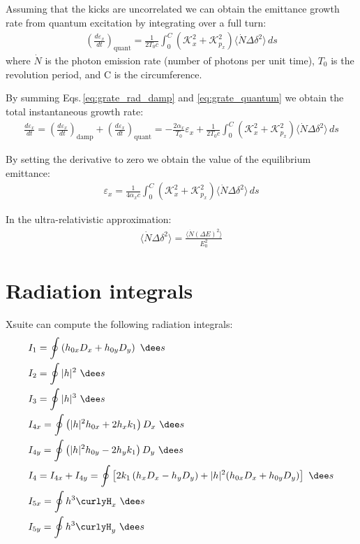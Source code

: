 Assuming that the kicks are uncorrelated we can obtain the emittance growth rate from quantum excitation by integrating over a full turn:
\begin{align}
\left(\frac {d\varepsilon_x}{dt} \right)_\text{quant}=
\frac{1}{2T_0c}\int_0^C\left(\mathcal{K}^2_x + \mathcal{K}^2_{p_x}\right)\langle\dot{N} \Delta \delta^2\rangle \,ds
\label{eq:grate_quantum}
\end{align}
where $\dot{N}$ is the photon emission rate (number of photons per unit time), $T_0$ is the revolution period, and C is the circumference.

By summing Eqs.\,\ref{eq:grate_rad_damp} and \ref{eq:grate_quantum} we obtain the total instantaneous growth rate:
\begin{align}
\frac {d\varepsilon_x}{dt} =
\left(\frac {d\varepsilon_x}{dt}\right)_\text{damp}
+
\left(\frac {d\varepsilon_x}{dt}\right)_\text{quant}
=
- \frac{2\alpha_x}{T_0}  \varepsilon_x
+
\frac{1}{2T_0c}\int_0^C\left(\mathcal{K}^2_x + \mathcal{K}^2_{p_x}\right)\langle\dot{N} \Delta \delta^2\rangle \,ds
\end{align}

By setting the derivative to zero we obtain the value of the equilibrium emittance:
\begin{align}
\varepsilon_x=
\frac{1}{4\alpha_xc}\int_0^C\left(\mathcal{K}^2_x + \mathcal{K}^2_{p_x}\right)\langle\dot{N} \Delta \delta^2\rangle \,ds
\label{eq:equilemi1}
\end{align}

In the ultra-relativistic approximation:
\begin{align}
\langle\dot{N} \Delta \delta^2\rangle =
\frac{\langle\dot{N} (\Delta E)^2\rangle}{E_0^2}
\label{eq:equilemi2}
\end{align}

\section{Radiation integrals}

Xsuite can compute the following radiation integrals:
\begin{align}
    &I_1 = \oint \left( h_{0x} D_x + h_{0y} D_y \right)\ \dee s\\
    &I_2 = \oint |h|^2 \ \dee s\\
    &I_3 = \oint |h|^3 \ \dee s\\
    &I_{4x} = \oint \left( |h|^2 h_{0x} + 2 h_x k_1 \right) D_x\ \dee s\\
    &I_{4y} = \oint \left( |h|^2 h_{0y} - 2 h_y k_1 \right) D_y\ \dee s\\
    &I_4 = I_{4x} + I_{4y} = \oint \left[ 2k_1 \left( h_x D_x - h_y D_y \right) + |h|^2 (h_{0x}D_x + h_{0y} D_y) \right] \ \dee s\\
    &I_{5x} = \oint h^3 \curlyH_x\ \dee s\\
    &I_{5y} = \oint h^3 \curlyH_y\ \dee s
\end{align}

